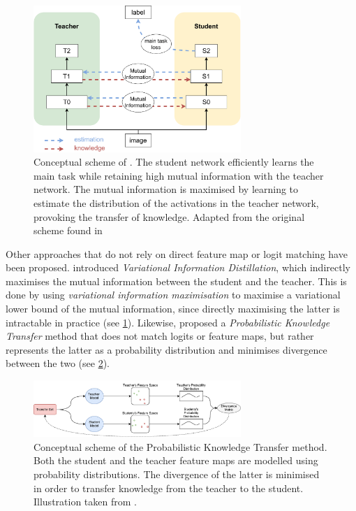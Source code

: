 \begin{figure}[htbp]
    \centering
    \includegraphics[width=0.7\textwidth]{chapter_sota/assets/variational_info_distillation.pdf}
    \caption{Conceptual scheme of \cite{DBLP:conf/cvpr/AhnHDLD19}. The student
    network efficiently learns the main task while retaining high mutual information
    with the teacher network. The mutual information is maximised by learning to
    estimate the distribution of the activations in the teacher network, provoking
    the transfer of knowledge. Adapted from the original
    scheme found in \cite{DBLP:conf/cvpr/AhnHDLD19}}
    \label{fig:sota:vid_scheme}
\end{figure}

Other approaches that do not rely on direct feature map or logit matching have
been proposed. \cite{DBLP:conf/cvpr/AhnHDLD19} introduced \emph{Variational
Information Distillation}, which indirectly maximises the mutual information
between the student and the teacher. This is done by using \emph{variational
information maximisation} \cite{barber2004algorithm} to maximise a variational
lower bound of the mutual information, since directly maximising the latter is
intractable in practice (see \cref{fig:sota:vid_scheme}). Likewise,
\cite{DBLP:conf/eccv/PassalisT18} proposed a \emph{Probabilistic Knowledge Transfer}
method that does not match logits or feature maps, but rather represents the
latter as a probability distribution and minimises divergence between the two
(see \cref{fig:sota:pkt_scheme}).\\


\begin{figure}[htbp]
    \centering
    \includegraphics[width=0.7\textwidth]{chapter_sota/assets/pkt_diagram.pdf}
    \caption{Conceptual scheme of the
    Probabilistic Knowledge Transfer method. Both the student and the teacher
    feature maps are modelled using probability distributions. The divergence of the
    latter is minimised in order to transfer knowledge from the teacher to the
    student. Illustration taken from \cite{DBLP:conf/eccv/PassalisT18}.}
    \label{fig:sota:pkt_scheme}
\end{figure}

